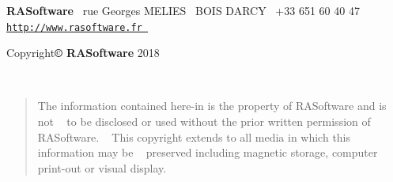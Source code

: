 



{\bfseries  R\+A\+Software}~ rue Georges M\+E\+L\+I\+ES~ B\+O\+IS D\textquotesingle{}A\+R\+CY~\newline
 +33 651 60 40 47~\newline
 \href{http://www.rasoftware.fr}{\tt http\+://www.\+rasoftware.\+fr } ~\newline
~\newline


\begin{center}Copyright{\bfseries © R\+A\+Software} 2018 \end{center}  ~\newline


\begin{quote}
The information contained here-\/in is the property of R\+A\+Software and is not ~\newline
to be disclosed or used without the prior written permission of R\+A\+Software. ~\newline
This copyright extends to all media in which this information may be ~\newline
preserved including magnetic storage, computer print-\/out or visual display. ~\newline
\end{quote}
~\newline
~\newline
 

 